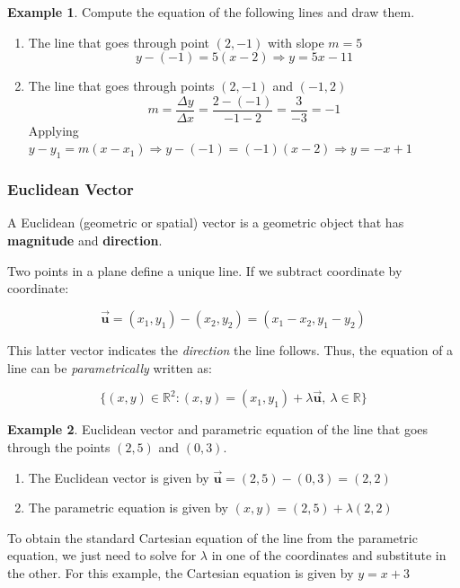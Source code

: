 \documentclass[a4paper,11pt]{article}
\theoremstyle{definition}
\newtheorem{example}{Example}
\theoremstyle{plain}
\begin{document}
\begin{example} 
Compute the equation of the following lines and draw
them.

\begin{enumerate}
\def\labelenumi{\arabic{enumi}.}
\item
  The line that goes through point \((2, -1)\) with slope \(m = 5\) \[
  y - (-1) = 5(x - 2) \Rightarrow y = 5x - 11
  \]
\item
  The line that goes through points \((2, -1)\) and \((-1,2)\) \[
  m = \frac{\Delta y}{\Delta x} = \frac{2-(-1)}{-1-2} = \frac{3}{-3} = -1 
  \] Applying
  \(y - y_1 = m(x - x_1) \Rightarrow y-(-1) = (-1)(x-2) \Rightarrow y = -x + 1\)
\end{enumerate}
\end{example}

\subsubsection{Euclidean Vector}\label{euclidean-vector}

A Euclidean (geometric or spatial) vector is a geometric object that has
\textbf{magnitude} and \textbf{direction}.

Two points in a plane define a unique line. If we subtract coordinate by
coordinate:

\[
\vec{\mathbf{u}} = (x_1, y_1) - (x_2, y_2) = (x_1 - x_2, y_1 - y_2)
\]

This latter vector indicates the \emph{direction} the line follows.
Thus, the equation of a line can be \emph{parametrically} written as:

\[
\{(x,y)\in\mathbb{R}^2 : (x, y) = (x_1, y_1) + \lambda\vec{\mathbf{u}}, \ \lambda\in\mathbb{R}\}
\]

\begin{example} 
Euclidean vector and parametric equation of the line
that goes through the points \((2,5)\) and \((0,3)\).

\begin{enumerate}
\def\labelenumi{\arabic{enumi}.}
\item
  The Euclidean vector is given by
  \(\vec{\mathbf{u}} = (2,5)-(0,3) = (2,2)\)
\item
  The parametric equation is given by \((x,y) = (2,5) + \lambda(2,2)\)
\end{enumerate}

To obtain the standard Cartesian equation of the line from the
parametric equation, we just need to solve for \(\lambda\) in one of the
coordinates and substitute in the other. For this example, the Cartesian
equation is given by \(y = x + 3\)
\end{example}
\end{document}
